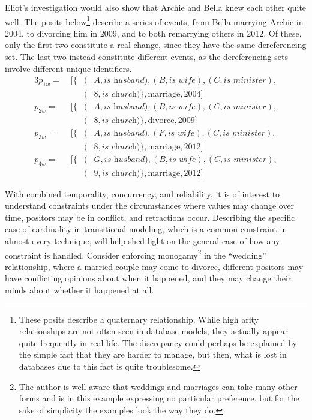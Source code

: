 \documentclass[sfsidenotes,nobib,twoside,symmetric]{tufte-handout}
\begin{document}
Eliot's investigation would also show that Archie and Bella knew each other quite well. The posits below\footnote{These posits describe a quaternary relationship. While high arity relationships are not often seen in database models, they actually appear quite frequently in real life. The discrepancy could perhaps be explained by the simple fact that they are harder to manage, but then, what is lost in databases due to this fact is quite troublesome.} describe a series of events, from Bella marrying Archie in 2004, to divorcing him in 2009, and to both remarrying others in 2012. Of these, only the first two constitute a real change, since they have the same dereferencing set. The last two instead constitute different events, as the dereferencing sets involve different unique identifiers. 
\begin{alignat*}{3}
p_{1w} =\;& [\{&(&A, \textit{is husband}),(B, \textit{is wife}),(C, \textit{is minister}), \\
&&(&8, \textit{is church})\}, \textrm{marriage}, 2004] \\
p_{2w} =\;& [\{&(&A, \textit{is husband}),(B, \textit{is wife}),(C, \textit{is minister}), \\
&&(&8, \textit{is church})\}, \textrm{divorce}, 2009] \\
p_{3w} =\;& [\{&(&A, \textit{is husband}),(F, \textit{is wife}),(C, \textit{is minister}), \\
&&(&8, \textit{is church})\}, \textrm{marriage}, 2012] \\
p_{4w} =\;& [\{&(&G, \textit{is husband}),(B, \textit{is wife}),(C, \textit{is minister}), \\
&&(&9, \textit{is church})\}, \textrm{marriage}, 2012] 
\end{alignat*}

With combined temporality, concurrency, and reliability, it is of interest to understand constraints under the circumstances where values may change over time, positors may be in conflict, and retractions occur. Describing the specific case of cardinality in transitional modeling, which is a common constraint in almost every technique, will help shed light on the general case of how any constraint is handled. Consider enforcing monogamy\footnote{The author is well aware that weddings and marriages can take many other forms and is in this example expressing no particular preference, but for the sake of simplicity the examples look the way they do.} in the \enquote{wedding} relationship, where a married couple may come to divorce, different positors may have conflicting opinions about when it happened, and they may change their minds about whether it happened at all.   
\end{document}

